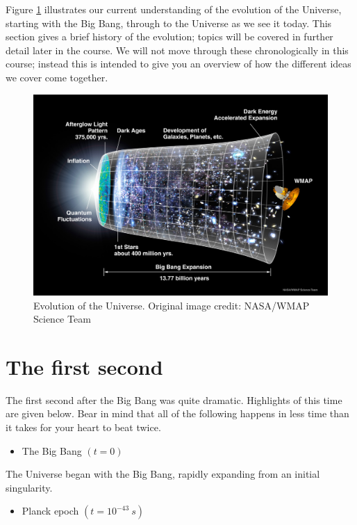\documentclass[11pt,a4paper]{book}
\providecommand{\tightlist}{%
  \setlength{\itemsep}{0pt}\setlength{\parskip}{0pt}}
\begin{document}
Figure \ref{fig:evo-universe} illustrates our current understanding of
the evolution of the Universe, starting with the Big Bang, through to
the Universe as we see it today. This section gives a brief history of
the evolution; topics will be covered in further detail later in the
course. We will not move through these chronologically in this course;
instead this is intended to give you an overview of how the different
ideas we cover come together.

\begin{figure}
\includegraphics[width=1\linewidth]{Images/060915_CMB_Timeline150_annotated} \caption{Evolution of the Universe. Original image credit: NASA/WMAP Science Team}\label{fig:evo-universe}
\end{figure}

\hypertarget{sec:first_second}{%
\section{The first second}\label{sec:first_second}}

The first second after the Big Bang was quite dramatic. Highlights of
this time are given below. Bear in mind that all of the following
happens in less time than it takes for your heart to beat twice.

\begin{itemize}
\tightlist
\item
  The Big Bang \((t = 0)\)
\end{itemize}

The Universe began with the Big Bang, rapidly expanding from an initial
singularity.

\begin{itemize}
\tightlist
\item
  Planck epoch \((t = 10^{-43}~s)\)
\end{itemize}
\end{document}
